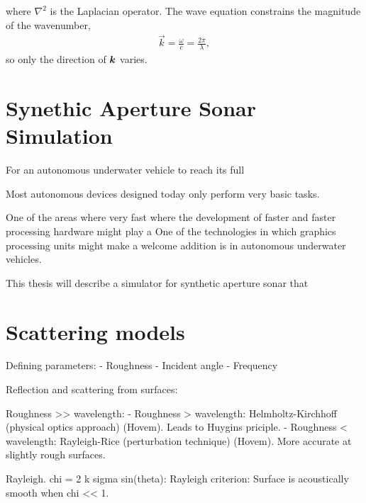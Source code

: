 where $\nabla^2$ is the Laplacian operator. The wave equation constrains the magnitude of the wavenumber,
%
\begin{align*}
\vec k = \frac{\omega}{c} = \frac{2\pi}{\lambda},
\end{align*}
%
so only the direction of $\boldsymbol{k}$ varies.

\section{Synethic Aperture Sonar Simulation}

For an autonomous underwater vehicle to reach its full 

Most autonomous devices designed today only perform very basic tasks.

One of the areas where very fast where the development of faster and faster processing hardware might play a
One of the technologies in which graphics processing units might make a welcome addition is in autonomous underwater vehicles. 

This thesis will describe a simulator for synthetic aperture sonar that 

\section{Scattering models}


Defining parameters:
- Roughness
- Incident angle
- Frequency


Reflection and scattering from surfaces:

Roughness >> wavelength:
- Roughness > wavelength: Helmholtz-Kirchhoff (physical optics approach) (Hovem). Leads to Huygins priciple.
- Roughness < wavelength: Rayleigh-Rice (perturbation technique) (Hovem). More accurate at slightly rough surfaces.

Rayleigh. chi = 2 k sigma sin(theta): Rayleigh criterion: Surface is acoustically smooth when chi << 1.

